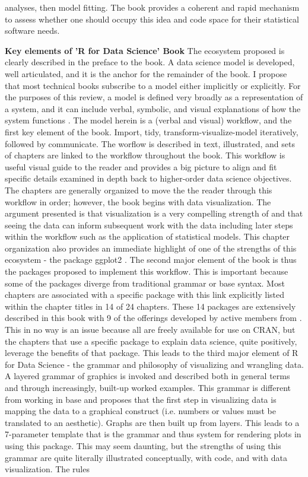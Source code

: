 \documentclass[bookreview]{jss}
\begin{document}
analyses, then model fitting. The book provides a coherent and rapid mechanism to assess whether one should occupy this idea and code space for their statistical software needs. \newline

\textbf{Key elements of 'R for Data Science' Book} \newline
The ecosystem proposed is clearly described in the preface to the book. A data science model is developed, well articulated, and it is the anchor for the remainder of the book. I propose that most technical books subscribe to a model either implicitly or explicitly. For the purposes of this review, a model is defined very broadly as a representation of a system, and it can include verbal, symbolic, and visual explanations of how the system functions \citep{Eaton2016}. The model herein is a (verbal and visual) workflow, and the first key element of the book. Import, tidy, transform-visualize-model iteratively, followed by communicate. The worflow is described in text, illustrated, and sets of chapters are linked to the workflow throughout the book. This workflow is useful visual guide to the reader and provides a big picture to align and fit specific details examined in depth back to higher-order data science objectives. The chapters are generally organized to move the the reader through this workflow in order; however, the book begins with data visualization. The argument presented is that visualization is a very compelling strength of  and that seeing the data can inform subsequent work with the data including later steps within the workflow such as the application of statistical models. This chapter organization also provides an immediate highlight of one of the strengths of this ecosystem - the package ggplot2 \citep{Wickham2009}. The second major element of the book is thus the packages proposed to implement this workflow. This is important because some of the packages diverge from traditional grammar or base  syntax. Most chapters are associated with a specific package with this link explicitly listed within the chapter titles in 14 of 24 chapters. These 14 packages are extensively described in this book with 9 of the offerings developed by active members from . This in no way is an issue because all are freely available for use on CRAN, but the chapters that use a specific package to explain data science, quite positively, leverage the benefits of that package. This leads to the third major element of R for Data Science - the grammar and philosophy of visualizing and wrangling data. A layered grammar of graphics is invoked \citep{Wickham2010} and described both in general terms and through increasingly, built-up worked examples. This grammar is different from working in base  and proposes that the first step in visualizing data is mapping the data to a graphical construct (i.e. numbers or values must be translated to an aesthetic). Graphs are then built up from layers. This leads to a 7-parameter template that is the grammar and thus system for rendering plots in  using this package. This may seem daunting, but the strengths of using this grammar are quite literally illustrated conceptually, with code, and with data visualization. The rules 
\end{document}
